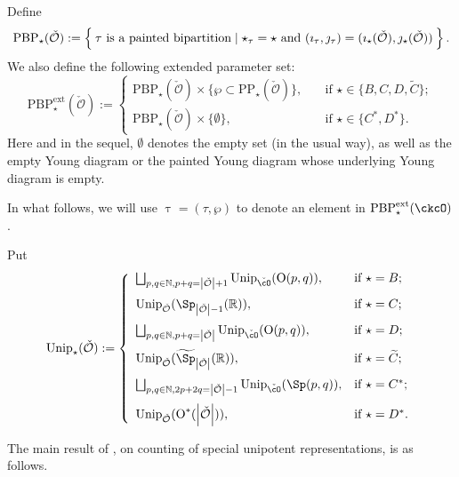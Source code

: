 \documentclass[12pt,a4paper]{amsart}
\def\abs#1{\left|{#1}\right|}
\newcommand{\BN}{{\mathbb {N}}}
\newcommand{\CO}{{\mathcal {O}}}
\newcommand{\oO}{\operatorname{O}}
\newcommand{\R}{\mathbb R}
\numberwithin{equation}{section}
\theoremstyle{remark}
\def\Unip{\mathrm{Unip}}
\def\PBPes{\mathrm{PBP}^{\mathrm{ext}}_{\star}}
\begin{document}


Define
\[
\mathrm{PBP}_\star(\check \CO):=\Set{
\tau\textrm{ is a painted bipartition}  \mid  \star_\tau = \star \text{ and } (\imath_\tau,\jmath_\tau) = (\imath_\star(\check \CO), \jmath_\star(\check \CO))
}.
\]
We also define the following extended parameter set:
\begin{equation}\label{def:PBPes}
\PBPes(\check \CO):=\begin{cases}
\mathrm{PBP}_\star(\check \CO)\times \{\wp\subset \mathrm{PP}_\star(\check \CO)\},\quad& \textrm{if }\star\in \{B,C, D, \widetilde C\};\\
\mathrm{PBP}_\star(\check \CO)\times \{\emptyset \},\quad& \textrm{if }\star\in \{C^*, D^*\}.
\end{cases}
\end{equation}
Here and in the sequel, $\emptyset$ denotes the empty set (in the usual way), as well as the empty Young diagram or the painted Young diagram whose underlying Young diagram is empty.

In what follows, we will use $\uptau=(\tau,\wp)$ to denote an element in $\PBPes(\ckcO)$.

Put
\begin{equation}\label{def:unipGc}
  \mathrm{Unip}_{\star}(\check \CO):=\left\{
     \begin{array}{ll}
         \bigsqcup_{p,q\in \BN, p+q=\abs{\check \CO}+1} \Unip_{\check \cO}(\oO(p,q)), &\hbox{if $\star=B$}; \medskip\\
           \Unip_{\check \CO}(\Sp_{\abs{\check \CO}-1}(\R)), &\hbox{if $\star=C$}; \medskip\\
           \bigsqcup_{p,q\in \BN, p+q=\abs{\check \CO}} \Unip_{\check \cO}(\oO(p,q)), &\hbox{if $\star=D$}; \medskip\\
          \Unip_{\check \CO}(\widetilde \Sp_{\abs{\check \CO}}(\R)), &\hbox{if $\star=\widetilde{ C}$}; \medskip \\
     \bigsqcup_{p,q\in \BN, 2p+2q=\abs{\check \CO}-1} \Unip_{\check \cO}(\Sp(p,q)), &\hbox{if $\star=C^*$}; \medskip \\
          \Unip_{\check \CO} (\oO^*(\abs{\check \CO})), &\hbox{if $\star=D^*$}.\\
            \end{array}
   \right.
\end{equation}

The main result of \cite{BMSZ2}, on counting of special unipotent representations, is as follows.
\end{document}
